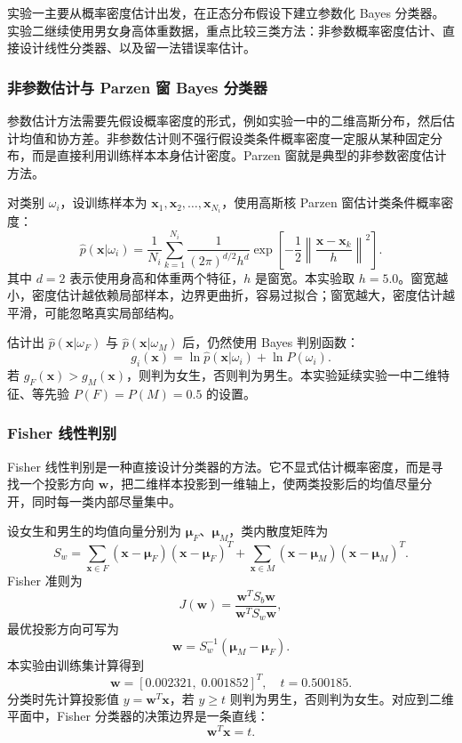\documentclass[UTF8,a4paper,12pt]{ctexart}
\begin{document}
实验一主要从概率密度估计出发，在正态分布假设下建立参数化 Bayes 分类器。实验二继续使用男女身高体重数据，重点比较三类方法：非参数概率密度估计、直接设计线性分类器、以及留一法错误率估计。

\subsubsection{非参数估计与 Parzen 窗 Bayes 分类器}

参数估计方法需要先假设概率密度的形式，例如实验一中的二维高斯分布，然后估计均值和协方差。非参数估计则不强行假设类条件概率密度一定服从某种固定分布，而是直接利用训练样本本身估计密度。Parzen 窗就是典型的非参数密度估计方法。

对类别 $\omega_i$，设训练样本为 $\boldsymbol{x}_1,\boldsymbol{x}_2,\ldots,\boldsymbol{x}_{N_i}$，使用高斯核 Parzen 窗估计类条件概率密度：
\[
\hat{p}(\boldsymbol{x}|\omega_i)=
\frac{1}{N_i}\sum_{k=1}^{N_i}
\frac{1}{(2\pi)^{d/2}h^d}
\exp\left[-\frac{1}{2}\left\|\frac{\boldsymbol{x}-\boldsymbol{x}_k}{h}\right\|^2\right].
\]
其中 $d=2$ 表示使用身高和体重两个特征，$h$ 是窗宽。本实验取 $h=5.0$。窗宽越小，密度估计越依赖局部样本，边界更曲折，容易过拟合；窗宽越大，密度估计越平滑，可能忽略真实局部结构。

估计出 $\hat{p}(\boldsymbol{x}|\omega_F)$ 与 $\hat{p}(\boldsymbol{x}|\omega_M)$ 后，仍然使用 Bayes 判别函数：
\[
g_i(\boldsymbol{x})=\ln \hat{p}(\boldsymbol{x}|\omega_i)+\ln P(\omega_i).
\]
若 $g_F(\boldsymbol{x})>g_M(\boldsymbol{x})$，则判为女生，否则判为男生。本实验延续实验一中二维特征、等先验 $P(F)=P(M)=0.5$ 的设置。

\subsubsection{Fisher 线性判别}

Fisher 线性判别是一种直接设计分类器的方法。它不显式估计概率密度，而是寻找一个投影方向 $\boldsymbol{w}$，把二维样本投影到一维轴上，使两类投影后的均值尽量分开，同时每一类内部尽量集中。

设女生和男生的均值向量分别为 $\boldsymbol{\mu}_F$、$\boldsymbol{\mu}_M$，类内散度矩阵为
\[
S_w=\sum_{\boldsymbol{x}\in F}(\boldsymbol{x}-\boldsymbol{\mu}_F)(\boldsymbol{x}-\boldsymbol{\mu}_F)^T+
\sum_{\boldsymbol{x}\in M}(\boldsymbol{x}-\boldsymbol{\mu}_M)(\boldsymbol{x}-\boldsymbol{\mu}_M)^T.
\]
Fisher 准则为
\[
J(\boldsymbol{w})=\frac{\boldsymbol{w}^T S_b\boldsymbol{w}}{\boldsymbol{w}^T S_w\boldsymbol{w}},
\]
最优投影方向可写为
\[
\boldsymbol{w}=S_w^{-1}(\boldsymbol{\mu}_M-\boldsymbol{\mu}_F).
\]
本实验由训练集计算得到
\[
\boldsymbol{w}=[0.002321,\;0.001852]^T,
\quad t=0.500185.
\]
分类时先计算投影值 $y=\boldsymbol{w}^T\boldsymbol{x}$，若 $y\ge t$ 则判为男生，否则判为女生。对应到二维平面中，Fisher 分类器的决策边界是一条直线：
\[
\boldsymbol{w}^T\boldsymbol{x}=t.
\]
\end{document}
